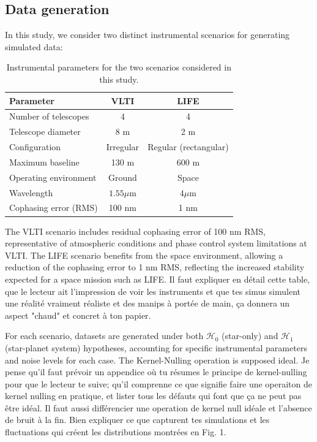 \documentclass{article}
\newcommand{\dm}[1]{{\color{mulberry} #1}}
\begin{document}
\subsection{Data generation}

In this study, we consider two distinct instrumental scenarios for generating simulated data:

\begin{table}[H]
\centering
\begin{tabular}{|l|c|c|}
\hline
\textbf{Parameter} & \textbf{VLTI} & \textbf{LIFE} \\
\hline
Number of telescopes & 4 & 4 \\
Telescope diameter & 8 m & 2 m \\
Configuration & Irregular & Regular (rectangular) \\
Maximum baseline & 130 m & 600 m \\
Operating environment & Ground & Space \\
Wavelength & $1.55\mu$m & $4\mu$m \\
Cophasing error (RMS) & 100 nm & 1 nm \\
\hline
\end{tabular}
\caption{Instrumental parameters for the two scenarios considered in this study.}
\label{tab:scenarios}
\end{table}

The VLTI scenario includes residual cophasing error of 100 nm RMS, representative of atmospheric conditions and phase control system limitations at VLTI. The LIFE scenario benefits from the space environment, allowing a reduction of the cophasing error to 1 nm RMS, reflecting the increased stability expected for a space mission such as LIFE.\dm{Il faut expliquer en détail cette table, que le lecteur ait l'impression de voir les instruments et que tes simus simulent une réalité vraiment réaliste et des manips à portée de main, ça donnera un aspect "chaud" et concret à ton papier.}

For each scenario, datasets are generated under both $\mathcal{H}_0$ (star-only) and $\mathcal{H}_1$ (star-planet system) hypotheses, accounting for specific instrumental parameters and noise levels for each case. The Kernel-Nulling operation is supposed ideal.\dm{Je pense qu'il faut prévoir un appendice où tu résumes le principe de kernel-nulling pour que le lecteur te suive; qu'il comprenne ce que signifie faire une operaiton de kernel nulling en pratique, et lister tous les défauts qui font que ça ne peut pas être idéal. Il faut aussi différencier une operation de kernel null idéale et l'absence de bruit à la fin. Bien expliquer ce que capturent tes simulations et les fluctuations qui créent les distributions montrées en Fig. 1.}
\end{document}
